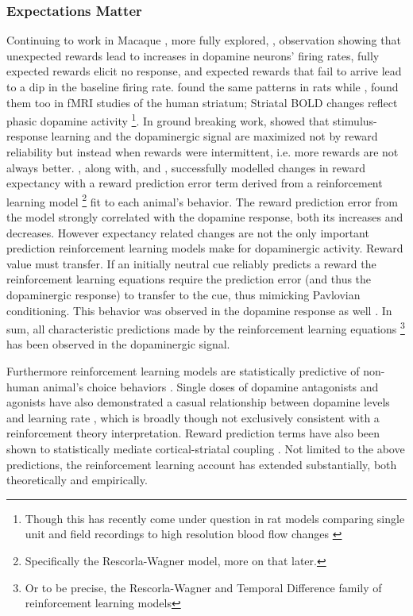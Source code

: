 \documentclass[doc,12pt]{apa}        %
\begin{document}
\subsubsection{Expectations Matter} %
\label{subsub:expectations}
Continuing to work in Macaque , more fully explored, , observation showing that unexpected rewards lead to increases in dopamine neurons' firing rates, fully expected rewards elicit no response, and expected rewards that fail to arrive lead to a dip in the baseline firing rate.    found the same patterns in rats while , found them too in fMRI studies of the human striatum; Striatal BOLD changes reflect phasic dopamine activity \cite{Schonberg:2009p6669,Surmeier:2007p4435}
\footnote{
    Though this has recently come under question in rat models comparing single unit and field recordings to high resolution blood flow changes \cite{Mishra:2011p9095}}. In ground breaking work,  showed that stimulus-response learning and the dopaminergic signal are maximized not by reward reliability but instead when rewards were intermittent, i.e. more rewards are not always better.  , along with,  and , successfully modelled changes in reward expectancy with a reward prediction error term derived from a reinforcement learning model
\footnote{
    Specifically the Rescorla-Wagner model, more on that later.
} fit to each animal's behavior. The reward prediction error from the model strongly correlated with the dopamine response, both its increases and decreases. However expectancy related changes are not the only important prediction reinforcement learning models make for dopaminergic activity.  Reward value must transfer.  If an initially neutral cue reliably predicts a reward the reinforcement learning equations require the prediction error (and thus the dopaminergic response) to transfer to the cue, thus mimicking Pavlovian conditioning.  This behavior was observed in the dopamine response as well \cite{Roesch:2007p2519, McClure:2003p3346}.  In sum, all characteristic predictions made by the reinforcement learning equations
\footnote{Or to be precise, the Rescorla-Wagner and Temporal Difference family of reinforcement learning models} has been observed in the dopaminergic signal.

Furthermore reinforcement learning models are statistically predictive of non-human animal's choice behaviors \cite{Hampton:2007p2983}.  Single doses of dopamine antagonists and agonists have also demonstrated a casual relationship between dopamine levels and learning rate \cite{Pizzagalli:2008p6521, Diaconescu:2010p7631}, which is broadly though not exclusively consistent with a reinforcement theory interpretation.  Reward prediction terms have also been shown to statistically mediate cortical-striatal coupling \cite{denOuden:2010p7203}.  Not limited to the above predictions, the reinforcement learning account has extended substantially, both theoretically and empirically.
\end{document}
